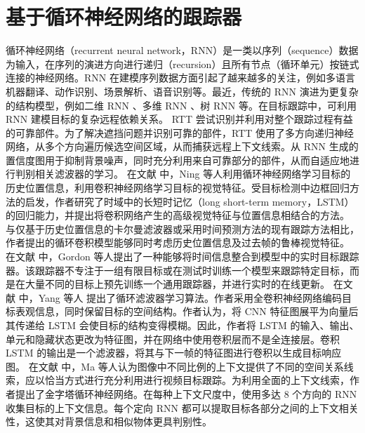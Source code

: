 \section{基于循环神经网络的跟踪器}
循环神经网络（recurrent neural network，RNN）是一类以序列（sequence）数据为输入，在序列的演进方向进行递归（recursion）且所有节点（循环单元）按链式连接的神经网络。RNN 在建模序列数据方面引起了越来越多的关注，例如多语言机器翻译、动作识别、场景解析、语音识别等。最近，传统的 RNN 演进为更复杂的结构模型，例如二维 RNN \cite{shuai2015quaddirectional}、多维 RNN \cite{stollenga2015parallel}、树 RNN \cite{tai2015improved} 等。在目标跟踪中，可利用 RNN 建模目标的复杂远程依赖关系。
RTT \cite{RTT} 尝试识别并利用对整个跟踪过程有益的可靠部件。为了解决遮挡问题并识别可靠的部件，RTT 使用了多方向递归神经网络，从多个方向遍历候选空间区域，从而捕获远程上下文线索。从 RNN 生成的置信度图用于抑制背景噪声，同时充分利用来自可靠部分的部件，从而自适应地进行判别相关滤波器的学习。%
在文献 \cite{SpatiallySupervised} 中，Ning 等人利用循环神经网络学习目标的历史位置信息，利用卷积神经网络学习目标的视觉特征。受目标检测中边框回归方法的启发，作者研究了时域中的长短时记忆（long short-term memory，LSTM）的回归能力，并提出将卷积网络产生的高级视觉特征与位置信息相结合的方法。
与仅基于历史位置信息的卡尔曼滤波器或采用时间预测方法的现有跟踪方法相比，作者提出的循环卷积模型能够同时考虑历史位置信息及过去帧的鲁棒视觉特征。%
在文献 \cite{gordon2018re} 中，Gordon 等人提出了一种能够将时间信息整合到模型中的实时目标跟踪器。该跟踪器不专注于一组有限目标或在测试时训练一个模型来跟踪特定目标，而是在大量不同的目标上预先训练一个通用跟踪器，并进行实时的在线更新。%
在文献 \cite{RecurrentFilter} 中，Yang 等人
提出了循环滤波器学习算法。作者采用全卷积神经网络编码目标表观信息，同时保留目标的空间结构。作者认为，将 CNN 特征图展平为向量后其传递给 LSTM 会使目标的结构变得模糊。因此，作者将 LSTM 的输入、输出、单元和隐藏状态更改为特征图，并在网络中使用卷积层而不是全连接层。卷积 LSTM 的输出是一个滤波器，将其与下一帧的特征图进行卷积以生成目标响应图。%
在文献 \cite{PRNet} 中，Ma 等人认为图像中不同比例的上下文提供了不同的空间关系线索，应以恰当方式进行充分利用进行视频目标跟踪。为利用全面的上下文线索，作者提出了金字塔循环神经网络。在每种上下文尺度中，使用多达 8 个方向的 RNN 收集目标的上下文信息。每个定向 RNN 都可以提取目标各部分之间的上下文相关性，这使其对背景信息和相似物体更具判别性。 %
